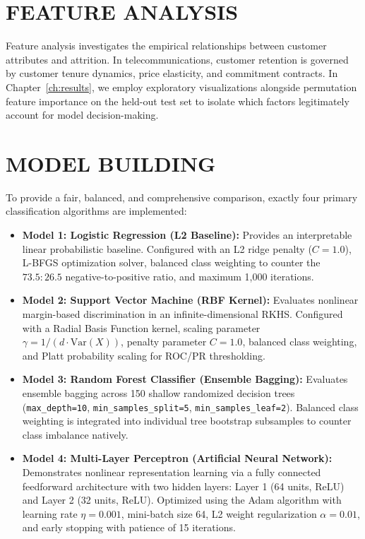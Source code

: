 \documentclass[12pt,a4paper]{report}
\begin{document}
\section{FEATURE ANALYSIS}
Feature analysis investigates the empirical relationships between customer attributes and attrition. In telecommunications, customer retention is governed by customer tenure dynamics, price elasticity, and commitment contracts. In Chapter~\ref{ch:results}, we employ exploratory visualizations alongside permutation feature importance on the held-out test set to isolate which factors legitimately account for model decision-making.

\section{MODEL BUILDING}
To provide a fair, balanced, and comprehensive comparison, exactly four primary classification algorithms are implemented:
\begin{itemize}
    \item \textbf{Model 1: Logistic Regression (L2 Baseline):}
    Provides an interpretable linear probabilistic baseline. Configured with an L2 ridge penalty ($C=1.0$), L-BFGS optimization solver, balanced class weighting to counter the $73.5:26.5$ negative-to-positive ratio, and maximum 1,000 iterations.
    
    \item \textbf{Model 2: Support Vector Machine (RBF Kernel):}
    Evaluates nonlinear margin-based discrimination in an infinite-dimensional RKHS. Configured with a Radial Basis Function kernel, scaling parameter $\gamma = 1 / (d \cdot \text{Var}(X))$, penalty parameter $C=1.0$, balanced class weighting, and Platt probability scaling for ROC/PR thresholding.
    
    \item \textbf{Model 3: Random Forest Classifier (Ensemble Bagging):}
    Evaluates ensemble bagging across 150 shallow randomized decision trees (\texttt{max\_depth=10}, \texttt{min\_samples\_split=5}, \texttt{min\_samples\_leaf=2}). Balanced class weighting is integrated into individual tree bootstrap subsamples to counter class imbalance natively.
    
    \item \textbf{Model 4: Multi-Layer Perceptron (Artificial Neural Network):}
    Demonstrates nonlinear representation learning via a fully connected feedforward architecture with two hidden layers: Layer 1 (64 units, ReLU) and Layer 2 (32 units, ReLU). Optimized using the Adam algorithm with learning rate $\eta=0.001$, mini-batch size 64, L2 weight regularization $\alpha=0.01$, and early stopping with patience of 15 iterations.
\end{itemize}
\end{document}
